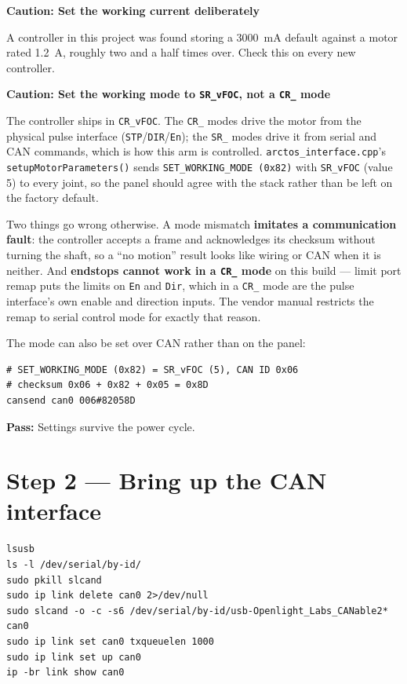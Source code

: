 \documentclass[11pt,letterpaper]{article}
\newenvironment{caution}[1]{%
    \par\addvspace{8pt}%
    \noindent{\color{cautionred}\rule{\linewidth}{0.8pt}}\par\vspace{2pt}
    \noindent\textbf{\color{cautionred}Caution: #1}\par\vspace{2pt}
}{%
    \par\vspace{2pt}\noindent{\color{cautionred}\rule{\linewidth}{0.4pt}}%
    \par\addvspace{8pt}%
}
\newcommand{\passif}[1]{\par\vspace{2pt}\noindent\textbf{\color{okgreen}Pass:} #1\par\vspace{4pt}}
\begin{document}
\begin{caution}{Set the working current deliberately}
A controller in this project was found storing a 3000~mA default against a motor
rated 1.2~A, roughly two and a half times over. Check this on every new controller.
\end{caution}

\begin{caution}{Set the working mode to \texttt{SR\_vFOC}, not a \texttt{CR\_} mode}
The controller ships in \texttt{CR\_vFOC}. The \texttt{CR\_} modes drive the motor from
the physical pulse interface (\texttt{STP}/\texttt{DIR}/\texttt{En}); the \texttt{SR\_}
modes drive it from serial and CAN commands, which is how this arm is controlled.
\texttt{arctos\_interface.cpp}'s \texttt{setupMotorParameters()} sends
\texttt{SET\_WORKING\_MODE (0x82)} with \texttt{SR\_vFOC} (value 5) to every joint, so
the panel should agree with the stack rather than be left on the factory default.

Two things go wrong otherwise. A mode mismatch \textbf{imitates a communication fault}:
the controller accepts a frame and acknowledges its checksum without turning the shaft,
so a ``no motion'' result looks like wiring or CAN when it is neither. And \textbf{endstops
cannot work in a \texttt{CR\_} mode} on this build --- limit port remap puts the limits on
\texttt{En} and \texttt{Dir}, which in a \texttt{CR\_} mode are the pulse interface's own
enable and direction inputs. The vendor manual restricts the remap to serial control mode
for exactly that reason.
\end{caution}

The mode can also be set over CAN rather than on the panel:

\begin{lstlisting}
# SET_WORKING_MODE (0x82) = SR_vFOC (5), CAN ID 0x06
# checksum 0x06 + 0x82 + 0x05 = 0x8D
cansend can0 006#82058D
\end{lstlisting}
\passif{Settings survive the power cycle.}

\section*{Step 2 --- Bring up the CAN interface}

\begin{lstlisting}
lsusb
ls -l /dev/serial/by-id/
sudo pkill slcand
sudo ip link delete can0 2>/dev/null
sudo slcand -o -c -s6 /dev/serial/by-id/usb-Openlight_Labs_CANable2* can0
sudo ip link set can0 txqueuelen 1000
sudo ip link set up can0
ip -br link show can0
\end{lstlisting}
\end{document}
